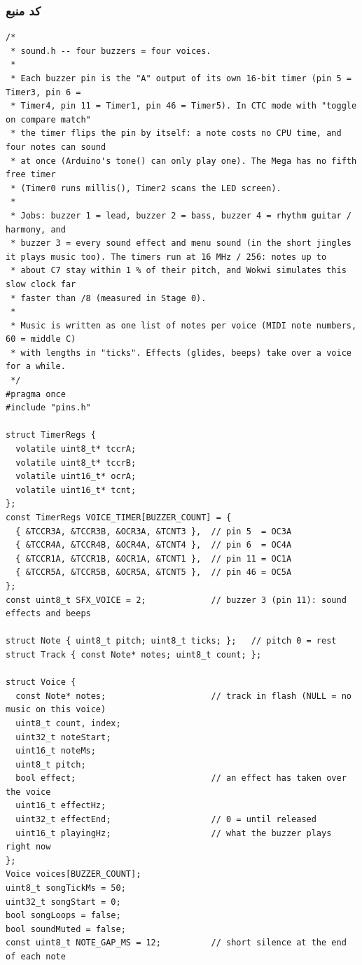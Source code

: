 \documentclass[11pt,a4paper]{article}
\begin{document}
\subsubsection*{کد منبع}
\begin{latin}
\begin{lstlisting}[language=Arduino]
/*
 * sound.h -- four buzzers = four voices.
 *
 * Each buzzer pin is the "A" output of its own 16-bit timer (pin 5 = Timer3, pin 6 =
 * Timer4, pin 11 = Timer1, pin 46 = Timer5). In CTC mode with "toggle on compare match"
 * the timer flips the pin by itself: a note costs no CPU time, and four notes can sound
 * at once (Arduino's tone() can only play one). The Mega has no fifth free timer
 * (Timer0 runs millis(), Timer2 scans the LED screen).
 *
 * Jobs: buzzer 1 = lead, buzzer 2 = bass, buzzer 4 = rhythm guitar / harmony, and
 * buzzer 3 = every sound effect and menu sound (in the short jingles it plays music too). The timers run at 16 MHz / 256: notes up to
 * about C7 stay within 1 % of their pitch, and Wokwi simulates this slow clock far
 * faster than /8 (measured in Stage 0).
 *
 * Music is written as one list of notes per voice (MIDI note numbers, 60 = middle C)
 * with lengths in "ticks". Effects (glides, beeps) take over a voice for a while.
 */
#pragma once
#include "pins.h"

struct TimerRegs {
  volatile uint8_t* tccrA;
  volatile uint8_t* tccrB;
  volatile uint16_t* ocrA;
  volatile uint16_t* tcnt;
};
const TimerRegs VOICE_TIMER[BUZZER_COUNT] = {
  { &TCCR3A, &TCCR3B, &OCR3A, &TCNT3 },  // pin 5  = OC3A
  { &TCCR4A, &TCCR4B, &OCR4A, &TCNT4 },  // pin 6  = OC4A
  { &TCCR1A, &TCCR1B, &OCR1A, &TCNT1 },  // pin 11 = OC1A
  { &TCCR5A, &TCCR5B, &OCR5A, &TCNT5 },  // pin 46 = OC5A
};
const uint8_t SFX_VOICE = 2;             // buzzer 3 (pin 11): sound effects and beeps

struct Note { uint8_t pitch; uint8_t ticks; };   // pitch 0 = rest
struct Track { const Note* notes; uint8_t count; };

struct Voice {
  const Note* notes;                     // track in flash (NULL = no music on this voice)
  uint8_t count, index;
  uint32_t noteStart;
  uint16_t noteMs;
  uint8_t pitch;
  bool effect;                           // an effect has taken over the voice
  uint16_t effectHz;
  uint32_t effectEnd;                    // 0 = until released
  uint16_t playingHz;                    // what the buzzer plays right now
};
Voice voices[BUZZER_COUNT];
uint8_t songTickMs = 50;
uint32_t songStart = 0;
bool songLoops = false;
bool soundMuted = false;
const uint8_t NOTE_GAP_MS = 12;          // short silence at the end of each note


\end{lstlisting}
\end{latin}
\end{document}
